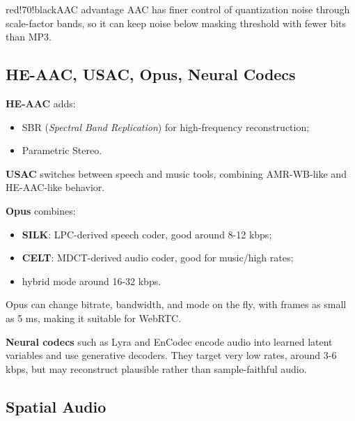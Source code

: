 \begin{calloutbox}{red!70!black}{AAC advantage}
AAC has finer control of quantization noise through scale-factor bands, so it can keep noise below masking threshold with fewer bits than MP3.
\end{calloutbox}

\subsection{HE-AAC, USAC, Opus, Neural Codecs}

\textbf{HE-AAC} adds:

\begin{itemize}
  \item SBR (\textit{Spectral Band Replication}) for high-frequency reconstruction;
  \item Parametric Stereo.
\end{itemize}

\textbf{USAC} switches between speech and music tools, combining AMR-WB-like and HE-AAC-like behavior.

\textbf{Opus} combines:

\begin{itemize}
  \item \textbf{SILK}: LPC-derived speech coder, good around 8-12 kbps;
  \item \textbf{CELT}: MDCT-derived audio coder, good for music/high rates;
  \item hybrid mode around 16-32 kbps.
\end{itemize}

Opus can change bitrate, bandwidth, and mode on the fly, with frames as small as 5 ms, making it suitable for WebRTC.

\textbf{Neural codecs} such as Lyra and EnCodec encode audio into learned latent variables and use generative decoders. They target very low rates, around 3-6 kbps, but may reconstruct plausible rather than sample-faithful audio.

\subsection{Spatial Audio}

\begin{center}
\end{center}

